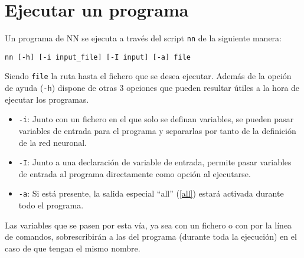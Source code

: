 \documentclass[a4paper]{article}
\begin{document}
\section{Ejecutar un programa}
Un programa de NN se ejecuta a través del script \texttt{nn} de la siguiente manera:

\hspace{2cm}\texttt{nn [-h] [-i input\_file] [-I input] [-a] file}

Siendo \texttt{file} la ruta hasta el fichero que se desea ejecutar.
Además de la opción de ayuda (\texttt{-h}) dispone de otras 3 opciones que pueden resultar útiles a la hora de ejecutar los programas.
\begin{itemize}
\item \texttt{-i}: Junto con un fichero en el que solo se definan variables, se pueden pasar variables de entrada para el programa y separarlas por tanto de la definición de la red neuronal.

\item \texttt{-I}: Junto a una declaración de variable de entrada, permite pasar variables de entrada al programa directamente como opción al ejecutarse.

\item \texttt{-a}: Si está presente, la salida especial ``all'' (\ref{all}) estará activada durante todo el programa.
\end{itemize}

Las variables que se pasen por esta vía, ya sea con un fichero o con por la línea de comandos, sobrescribirán a las del programa (durante toda la ejecución) en el caso de que tengan el mismo nombre.
\end{document}
